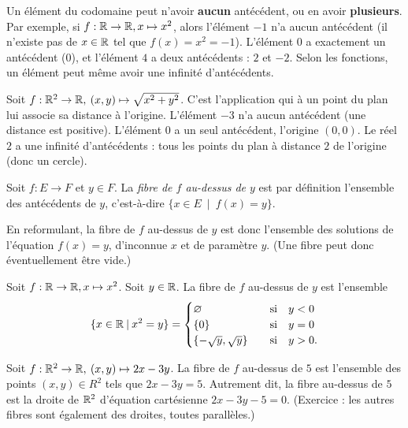 \begin{attention}
Un élément du codomaine peut n'avoir \textbf{aucun} antécédent, ou en avoir \textbf{plusieurs}. Par exemple, si $f : \mathbb{R}\to \mathbb{R}, x\mapsto x^2$, alors l'élément $-1$ n'a aucun antécédent (il n'existe pas de $x\in \mathbb{R}$ tel que $f(x)=x^2=-1$). L'élément $0$ a exactement un antécédent ($0$), et l'élément $4$ a deux antécédents : $2$ et $-2$. Selon les fonctions, un élément peut même avoir une infinité d'antécédents.
\end{attention}

\begin{exemple}
Soit $f : \mathbb{R}^2\to \mathbb{R},\: (x,y)\mapsto \sqrt{x^2+y^2}$. C'est l'application qui à un point du plan lui associe sa distance à l'origine. L'élément $-3$ n'a aucun antécédent (une distance est positive). L'élément $0$ a un seul antécédent, l'origine $(0,0)$. Le réel $2$ a une infinité d'antécédents : tous les points du plan à distance $2$ de l'origine (donc un cercle).
\end{exemple}



\begin{definition}
Soit $f : E\to F$ et $y\in F$. La \emph{fibre de $f$ au-dessus de $y$} est par définition l'ensemble des antécédents de $y$, c'est-à-dire $\{x\in E \:\mid\: f(x)=y\}$.

En reformulant, la fibre de $f$ au-dessus de $y$ est donc l'ensemble des solutions de l'équation $f(x)=y$, d'inconnue $x$ et de paramètre $y$. (Une fibre peut donc éventuellement être vide.)
\end{definition}

\begin{exemple}
Soit $f : \mathbb{R}\to \mathbb{R}, x\mapsto x^2$. Soit $y\in \mathbb{R}$. La fibre de $f$ au-dessus de $y$ est l'ensemble 
\[
\{x\in \mathbb{R}\:|\: x^2=y\} = 
\begin{cases}
\varnothing &\quad\text{si}\quad y<0\\
\{0\} & \quad\text{si}\quad y=0\\
\{-\sqrt y, \sqrt y\}& \quad\text{si}\quad y>0.
\end{cases}
\]
\end{exemple}

\begin{exemple}
Soit $f : \mathbb{R}^2\to \mathbb{R},\: (x,y)\mapsto 2x-3y$. La fibre de $f$ au-dessus de $5$ est l'ensemble des points $(x,y) \in R^2$ tels que $2x-3y=5$. Autrement dit, la fibre au-dessus de $5$ est la droite de $\mathbb{R}^2$ d'équation cartésienne $2x-3y-5=0$. (Exercice : les autres fibres sont également des droites, toutes parallèles.)
\end{exemple}

